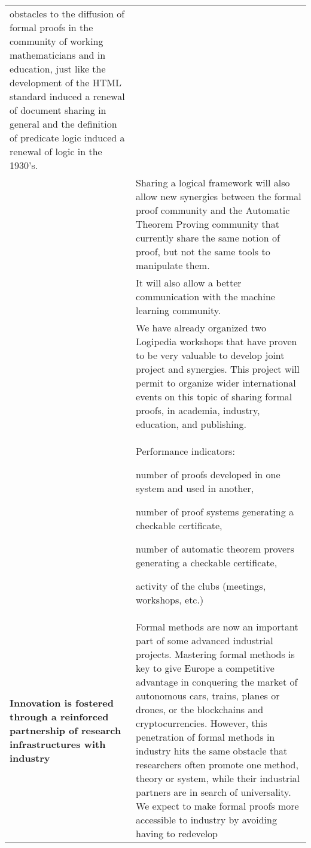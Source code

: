 \begin{longtable}{|p{}|p{}|}
obstacles to the diffusion of formal proofs in the community of
working mathematicians and in education, just like the development
of the HTML standard induced a renewal of document sharing in general
and the definition of predicate logic induced a renewal of logic in
the 1930's.\\
&
\hspace{0.4cm}
Sharing a logical framework will also allow new synergies between the
formal proof community and the Automatic Theorem Proving community
that currently share the same notion of proof, but not the same tools
to manipulate them.
\\
&
\hspace{0.4cm}
It will also allow a better communication with the machine learning community.\\
&
\hspace{0.4cm}
We have already organized two Logipedia workshops that have proven to
be very valuable to develop joint project and synergies.  This project
will permit to organize wider international events on this topic of
sharing formal proofs, in academia, industry, education, and
publishing.\\
&
\begin{framed}
Performance indicators:
\begin{compactitem}
  \item number of proofs developed in one system and used in another, 
  \item number of proof systems generating a checkable certificate, 
  \item number of automatic theorem provers generating a checkable certificate, 
  \item activity of the clubs (meetings, workshops, etc.)
\end{compactitem}
 \end{framed}
\\
\hline
{\bf Innovation is fostered through a reinforced partnership of
research infrastructures with industry}
&
Formal methods are now an important part of some advanced industrial
projects. Mastering formal methods is key to give Europe a competitive
advantage in conquering the market of autonomous cars, trains, planes
or drones, or the blockchains and cryptocurrencies. However, this
penetration of formal methods in industry hits the same obstacle that
researchers often promote one method, theory or system, while their
industrial partners are in search of universality. We expect to make
formal proofs more accessible to industry by avoiding having to redevelop

\end{longtable}
